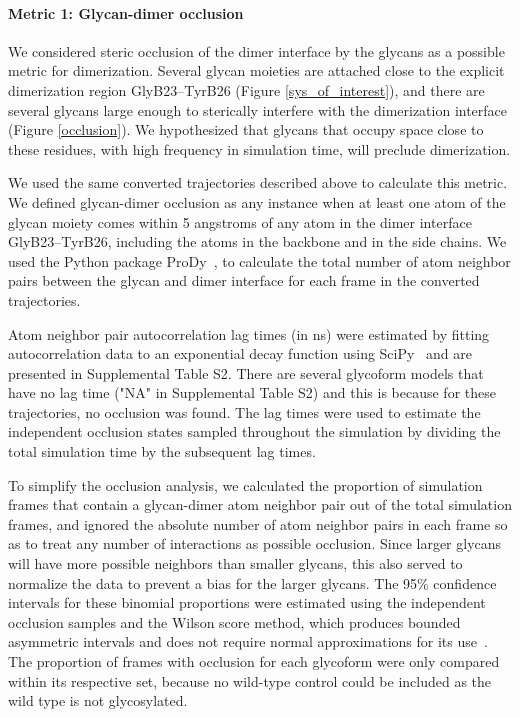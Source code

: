 \documentclass[9pt]{elife}
\begin{document}
\paragraph{Metric 1: Glycan-dimer occlusion}
We considered steric occlusion of the dimer interface by the glycans as a possible metric for dimerization. Several glycan moieties are attached close to the explicit dimerization region GlyB23--TyrB26 (Figure \ref{sys_of_interest}), and there are several glycans large enough to sterically interfere with the dimerization interface (Figure \ref{occlusion}). We hypothesized that glycans that occupy space close to these residues, with high frequency in simulation time, will preclude dimerization.

We used the same converted trajectories described above to calculate this metric. We defined glycan-dimer occlusion as any instance when at least one atom of the glycan moiety comes within 5 angstroms of any atom in the dimer interface GlyB23--TyrB26, including the atoms in the backbone and in the side chains. We used the Python package ProDy~\cite{bakan2011prody}, to calculate the total number of atom neighbor pairs between the glycan and dimer interface for each frame in the converted trajectories.

Atom neighbor pair autocorrelation lag times (in ns) were estimated by fitting autocorrelation data to an exponential decay function using SciPy~\cite{scipy2020pub, numpy2020pub} and are presented in Supplemental Table S2. There are several glycoform models that have no lag time ("NA" in Supplemental Table S2) and this is because for these trajectories, no occlusion was found. The lag times were used to estimate the independent occlusion states sampled throughout the simulation by dividing the total simulation time by the subsequent lag times.

To simplify the occlusion analysis, we calculated the proportion of simulation frames that contain a glycan-dimer atom neighbor pair out of the total simulation frames, and ignored the absolute number of atom neighbor pairs in each frame so as to treat any number of interactions as possible occlusion. Since larger glycans will have more possible neighbors than smaller glycans, this also served to normalize the data to prevent a bias for the larger glycans. The 95\% confidence intervals for these binomial proportions were estimated using the independent occlusion samples and the Wilson score method, which produces bounded asymmetric intervals and does not require normal approximations for its use~\cite{wilson1927score, newcombe1998intervals, wallis2013binomialscores}. The proportion of frames with occlusion for each glycoform were only compared within its respective set, because no wild-type control could be included as the wild type is not glycosylated.
\end{document}
